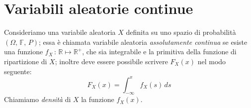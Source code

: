     \section{Variabili aleatorie continue}
        \begin{defn}\label{defn:Variabile_aleatoria_continua}
            Consideriamo una variabile aleatoria $X$ definita su uno spazio di probabilità $(\Omega,\,\mathbb{F},\,P)$; essa è chiamata variabile aleatoria \emph{assolutamente continua} se esiste una funzione $f_X\,:\, \mathbb{R} \mapsto \mathbb{R^+}$, che sia integrabile e la primitiva della funzione di ripartizione di $X$; inoltre deve essere possibile scrivere $F_X(x)$ nel modo seguente:
            \begin{equation}
                F_X(x) = \int_{-\infty}^{x} f_X(s)\, ds 
            \end{equation}
            Chiamiamo \emph{densità} di $X$ la funzione $f_X(x)$.
        \end{defn}
